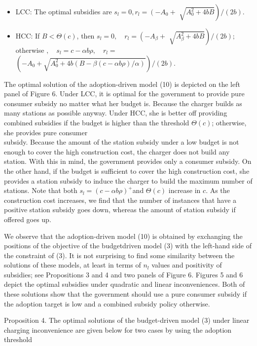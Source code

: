 \documentclass[10pt]{article}
\begin{document}
\begin{itemize}
  \item LCC: The optimal subsidies are $s_{l}=0, r_{l}=\left(-A_{0}+\right.$ $\left.\sqrt{A_{0}^{2}+4 b B}\right) /(2 b)$.
  \item HCC: If $B<\Theta(c)$, then $s_{l}=0, \quad r_{l}=\left(-A_{\beta}+\right.$ $\left.\sqrt{A_{\beta}^{2}+4 b B}\right) /(2 b) ; \quad$ otherwise $, \quad s_{l}=c-\alpha b \rho, \quad r_{l}=$ $\left(-A_{0}+\sqrt{A_{0}^{2}+4 b(B-\beta(c-\alpha b \rho) / \alpha)}\right) /(2 b)$.
\end{itemize}

The optimal solution of the adoption-driven model (10) is depicted on the left panel of Figure 6. Under LCC, it is optimal for the government to provide pure consumer subsidy no matter what her budget is. Because the charger builds as many stations as possible anyway. Under HCC, she is better off providing combined subsidies if the budget is higher than the threshold $\Theta(c)$; otherwise, she provides pure consumer\\
subsidy. Because the amount of the station subsidy under a low budget is not enough to cover the high construction cost, the charger does not build any station. With this in mind, the government provides only a consumer subsidy. On the other hand, if the budget is sufficient to cover the high construction cost, she provides a station subsidy to induce the charger to build the maximum number of stations. Note that both $s_{l}=(c-\alpha b \rho)^{+}$and $\Theta(c)$ increase in $c$. As the construction cost increases, we find that the number of instances that have a positive station subsidy goes down, whereas the amount of station subsidy if offered goes up.

We observe that the adoption-driven model (10) is obtained by exchanging the positions of the objective of the budgetdriven model (3) with the left-hand side of the constraint of (3). It is not surprising to find some similarity between the solutions of these models, at least in terms of $n_{l}$ values and positivity of subsidies; see Propositions 3 and 4 and two panels of Figure 6. Figures 5 and 6 depict the optimal subsidies under quadratic and linear inconveniences. Both of these solutions show that the government should use a pure consumer subsidy if the adoption target is low and a combined subsidy policy otherwise.

Proposition 4. The optimal solutions of the budget-driven model (3) under linear charging inconvenience are given below for two cases by using the adoption threshold
\end{document}

